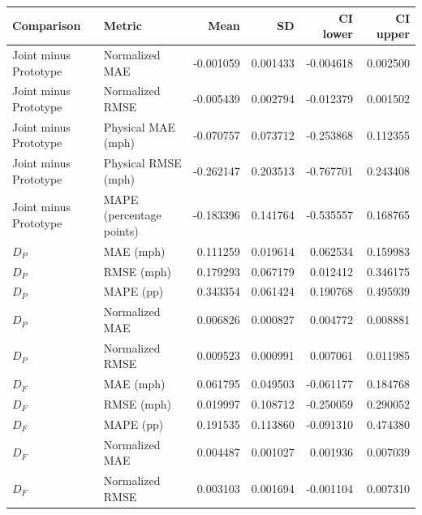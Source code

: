 \begingroup\color{revisionblue}
\sffamily\fontsize{9}{11}\selectfont\renewcommand{\arraystretch}{1.08}\setlength{\tabcolsep}{3pt}
\begin{tabular}{llrrrr}

\toprule
Comparison & Metric & Mean & SD & CI lower & CI upper \\
\midrule

Joint minus Prototype & Normalized MAE & -0.001059 & 0.001433 & -0.004618 & 0.002500 \\

Joint minus Prototype & Normalized RMSE & -0.005439 & 0.002794 & -0.012379 & 0.001502 \\

Joint minus Prototype & Physical MAE (mph) & -0.070757 & 0.073712 & -0.253868 & 0.112355 \\

Joint minus Prototype & Physical RMSE (mph) & -0.262147 & 0.203513 & -0.767701 & 0.243408 \\

Joint minus Prototype & MAPE (percentage points) & -0.183396 & 0.141764 & -0.535557 & 0.168765 \\

$D_P$ & MAE (mph) & 0.111259 & 0.019614 & 0.062534 & 0.159983 \\

$D_P$ & RMSE (mph) & 0.179293 & 0.067179 & 0.012412 & 0.346175 \\

$D_P$ & MAPE (pp) & 0.343354 & 0.061424 & 0.190768 & 0.495939 \\

$D_P$ & Normalized MAE & 0.006826 & 0.000827 & 0.004772 & 0.008881 \\

$D_P$ & Normalized RMSE & 0.009523 & 0.000991 & 0.007061 & 0.011985 \\

$D_F$ & MAE (mph) & 0.061795 & 0.049503 & -0.061177 & 0.184768 \\

$D_F$ & RMSE (mph) & 0.019997 & 0.108712 & -0.250059 & 0.290052 \\

$D_F$ & MAPE (pp) & 0.191535 & 0.113860 & -0.091310 & 0.474380 \\

$D_F$ & Normalized MAE & 0.004487 & 0.001027 & 0.001936 & 0.007039 \\

$D_F$ & Normalized RMSE & 0.003103 & 0.001694 & -0.001104 & 0.007310 \\


\end{tabular}
